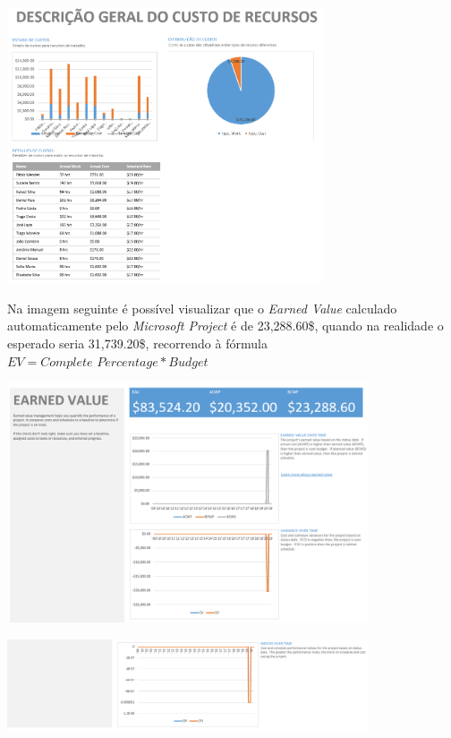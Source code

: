 \begin{center}
    \includegraphics[width=0.7\textwidth]{media/baseline2ResourcesCost.PNG}
\end{center}

Na imagem seguinte é possível visualizar que o \textit{Earned Value} calculado automaticamente pelo \textit{Microsoft Project} é de 23,288.60\$, quando na realidade o esperado seria 31,739.20\$, recorrendo à fórmula $EV = \textit{Complete Percentage} * \textit{Budget} $

\begin{center}
    \includegraphics[width=0.8\textwidth]{media/baseline2EarnedValue1.PNG}
\end{center}
\begin{center}
    \includegraphics[width=0.8\textwidth]{media/baseline2EarnedValue2.PNG}
\end{center}